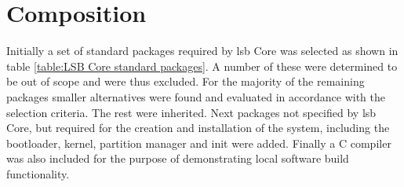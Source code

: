 \section{Composition}\label{Composition}

Initially a set of standard packages required by \gls{lsb} Core was selected as shown in table \ref{table:LSB Core standard packages}. A number of these were determined to be out of scope and were thus excluded. For the majority of the remaining packages smaller alternatives were found and evaluated in accordance with the selection criteria. The rest were inherited. Next packages not specified by \gls{lsb} Core, but required for the creation and installation of the system, including the bootloader, kernel, partition manager and init were added. Finally a C compiler was also included for the purpose of demonstrating local software build functionality.

\newpage

\newpage

\newpage

